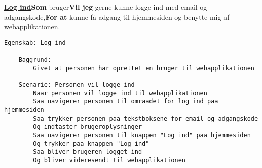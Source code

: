\noindent \textbf{\underline{Log ind}}\newline \textbf{Som} bruger\newline \textbf{Vil jeg} gerne kunne logge ind med email og adgangskode,\newline \textbf{For at} kunne få adgang til hjemmesiden og benytte mig af webapplikationen.

\begin{lstlisting}[language=Gherkin]
Egenskab: Log ind

    Baggrund:
        Givet at personen har oprettet en bruger til webapplikationen
        
	Scenarie: Personen vil logge ind
		Naar personen vil logge ind til webapplikationen
		Saa navigerer personen til omraadet for log ind paa hjemmesiden
		Saa trykker personen paa tekstboksene for email og adgangskode
		Og indtaster brugeroplysninger 
		Saa navigerer personen til knappen "Log ind" paa hjemmesiden
		Og trykker paa knappen "Log ind"
		Saa bliver brugeren logget ind 
		Og bliver videresendt til webapplikationen 
\end{lstlisting}

